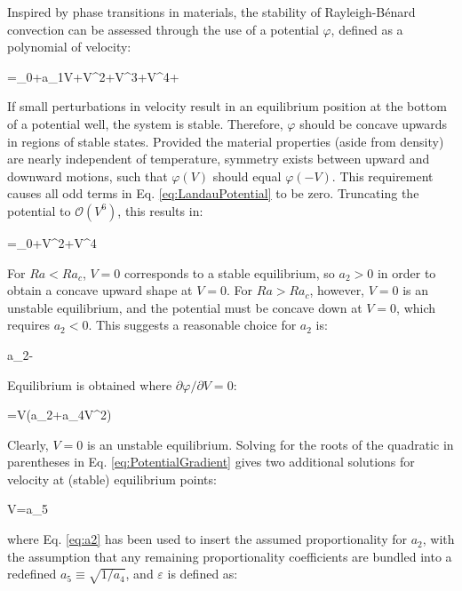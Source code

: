 \documentclass[10pt]{article}
\numberwithin{equation}{section} %
\begin{document}

Inspired by phase transitions in materials, the stability of Rayleigh-B\'enard convection can be assessed through the use of a potential \(\varphi\), defined as a polynomial of velocity:

\beq
\label{eq:LandauPotential}
\varphi=\varphi_0+a_1V+V^2+V^3+V^4+\cdots
\eeq

If small perturbations in velocity result in an equilibrium position at the bottom of a potential well, the system is stable. Therefore, \(\varphi\) should be concave upwards in regions of stable states. Provided the material properties (aside from density) are nearly independent of temperature, symmetry exists between upward and downward motions, such that \(\varphi(V)\) should equal \(\varphi(-V)\). This requirement causes all odd terms in Eq. \eqref{eq:LandauPotential} to be zero. Truncating the potential to \(\mathscr{O}(V^6)\), this results in:

\beq
\varphi=\varphi_0+V^2+V^4
\eeq

For \(Ra<Ra_c\), \(V=0\) corresponds to a stable equilibrium, so \(a_2>0\) in order to obtain a concave upward shape at \(V=0\). For \(Ra>Ra_c\), however, \(V=0\) is an unstable equilibrium, and the potential must be concave down at \(V=0\), which requires \(a_2<0\). This suggests a reasonable choice for \(a_2\) is:

\beq
\label{eq:a2}
a_2\propto-
\eeq

Equilibrium is obtained where \(\partial\varphi/\partial V=0\):

\beq
\label{eq:PotentialGradient}
=V\left(a_2+a_4V^2\right)
\eeq

Clearly, \(V=0\) is an unstable equilibrium. Solving for the roots of the quadratic in parentheses in Eq. \eqref{eq:PotentialGradient} gives two additional solutions for velocity at (stable) equilibrium points:

\beq
\label{eq:EquilibriumAmplitude}
V=\pm a_5\sqrt{\epsilon}
\eeq

where Eq. \eqref{eq:a2} has been used to insert the assumed proportionality for \(a_2\), with the assumption that any remaining proportionality coefficients are bundled into a redefined \(a_5\equiv \sqrt{1/a_4}\), and \(\varepsilon\) is defined as:
\end{document}
